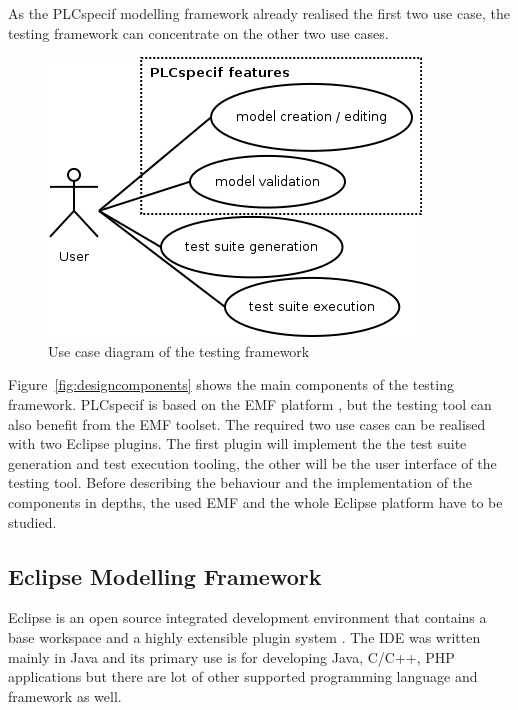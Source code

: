 As the PLCspecif modelling framework already realised the first two use case, the testing framework can concentrate on the other two use cases.

\begin{figure}[htp]
\centering
\includegraphics[scale=0.6]{figures/design_uc.png}
\caption{Use case diagram of the testing framework}
\label{fig:designuc}
\end{figure}

Figure~\ref{fig:designcomponents} shows the main components of the testing framework. PLCspecif is based on the EMF platform \cite{emf}\cite{emfbook}, but the testing tool can also benefit from the EMF toolset. The required two use cases can be realised with two Eclipse plugins. The first plugin will implement the the test suite generation and test execution tooling, the other will be the user interface of the testing tool. Before describing the behaviour and the implementation of the components in depths, the used EMF and the whole Eclipse platform have to be studied.

\newpage

\subsection{Eclipse Modelling Framework}
\label{sub:emf}

Eclipse is an open source integrated development environment that contains a base workspace and a highly extensible plugin system \cite{aosa}. The IDE was written mainly in Java and its primary use is for developing Java, C/C++, PHP applications but there are lot of other supported programming language and framework as well.

